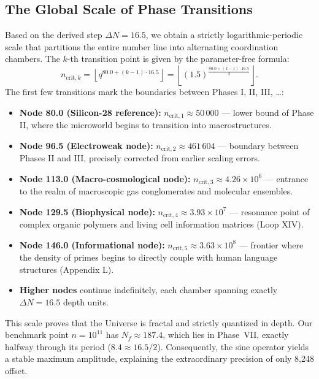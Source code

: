 \documentclass[12pt,a4paper]{article}
\begin{document}
	\subsection{The Global Scale of Phase Transitions}
	Based on the derived step \(\Delta N = 16.5\), we obtain a strictly logarithmic-periodic scale that partitions the entire number line into alternating coordination chambers. The \(k\)-th transition point is given by the parameter-free formula:
	\begin{equation}
		n_{\mathrm{crit},k} = \left\lfloor q^{80.0 + (k-1)\cdot 16.5} \right\rfloor 
		= \left\lfloor (1.5)^{\frac{80.0+(k-1)\cdot 16.5}{3}} \right\rfloor .
	\end{equation}
	The first few transitions mark the boundaries between Phases I, II, III, \dots:
	\begin{itemize}
		\item \textbf{Node 80.0 (Silicon-28 reference):} \(n_{\mathrm{crit},1} \approx 50\,000\) --- lower bound of Phase II, where the microworld begins to transition into macrostructures.
		\item \textbf{Node 96.5 (Electroweak node):} \(n_{\mathrm{crit},2} \approx 461\,604\) --- boundary between Phases II and III, precisely corrected from earlier scaling errors.
		\item \textbf{Node 113.0 (Macro-cosmological node):} \(n_{\mathrm{crit},3} \approx 4.26\times10^6\) --- entrance to the realm of macroscopic gas conglomerates and molecular ensembles.
		\item \textbf{Node 129.5 (Biophysical node):} \(n_{\mathrm{crit},4} \approx 3.93\times10^7\) --- resonance point of complex organic polymers and living cell information matrices (Loop XIV).
		\item \textbf{Node 146.0 (Informational node):} \(n_{\mathrm{crit},5} \approx 3.63\times10^8\) --- frontier where the density of primes begins to directly couple with human language structures (Appendix L).
		\item \textbf{Higher nodes} continue indefinitely, each chamber spanning exactly \(\Delta N = 16.5\) depth units.
	\end{itemize}
	
	This scale proves that the Universe is fractal and strictly quantized in depth. Our benchmark point \(n=10^{11}\) has \(N_f \approx 187.4\), which lies in Phase~VII, exactly halfway through its period (\(8.4 \approx 16.5/2\)). Consequently, the sine operator yields a stable maximum amplitude, explaining the extraordinary precision of only 8,248 offset.
	
\end{document}
